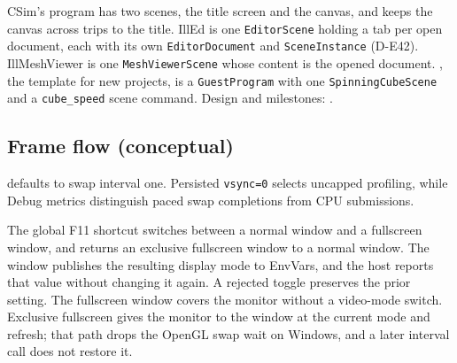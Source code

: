 CSim's program has two scenes, the title screen and the canvas, and keeps the
canvas across trips to the title. IllEd is one
\texttt{EditorScene} holding a tab per open document, each with its own
\texttt{EditorDocument} and \texttt{SceneInstance} (D-E42).
IllMeshViewer is one \texttt{MeshViewerScene} whose content is the opened
document. , the template for new projects, is a
\texttt{GuestProgram} with one \texttt{SpinningCubeScene} and a
\texttt{cube\_speed} scene command. Design and milestones:
.

\subsection{Frame flow (conceptual)}
\begin{center}
\end{center}

 defaults to swap interval one. Persisted
\texttt{vsync=0} selects uncapped profiling, while Debug metrics distinguish
paced swap completions from CPU submissions.

The global F11 shortcut switches between a normal window and a fullscreen
window, and returns an exclusive fullscreen window to a normal window. The
window publishes the resulting display mode to EnvVars, and the host reports
that value without changing it again. A rejected toggle preserves the prior
setting. The fullscreen window covers the monitor without a video-mode
switch. Exclusive fullscreen gives the monitor to the window at the current
mode and refresh; that path drops the OpenGL swap wait on Windows, and a
later interval call does not restore it.

